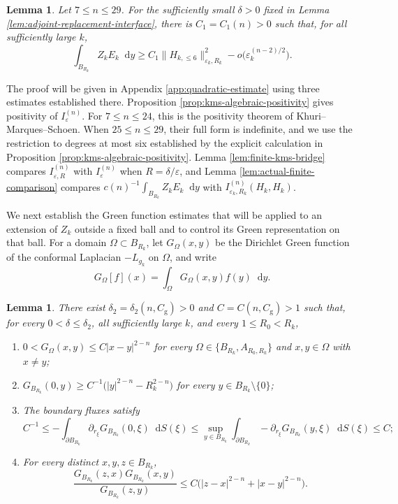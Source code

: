 \documentclass[11pt]{article}
\numberwithin{equation}{section}
\newtheorem{lemma}[theorem]{Lemma}
\theoremstyle{remark}
\newcommand{\dd}{\mathop{}\!\mathrm{d}}
\begin{document}
\begin{lemma} \label{lem:signed-residual}
Let $7\le n\le29$. For the sufficiently small $\delta>0$ fixed in
Lemma  \ref{lem:adjoint-replacement-interface}, there is
$C_1=C_1(n)>0$ such that, for all sufficiently large $k$,
{
\[
 \int_{B_{R_k}}Z_kE_k\dd y
 \ge C_1\|H_{k,\le6}\|_{\varepsilon_k,R_k}^2
 -o\bigl(\varepsilon_k^{(n-2)/2}\bigr).
\]
}
\end{lemma}

 The proof will be given in
Appendix  \ref{app:quadratic-estimate} using
three estimates established there.  Proposition  \ref{prop:kms-algebraic-positivity}
gives positivity of $I_\varepsilon^{(n)}$.  For $7\le n\le24$, this is the positivity theorem of
Khuri--Marques--Schoen.  When $25\le n\le29$, their full form is
indefinite, and we use the restriction to degrees at most six
established by the explicit calculation in
Proposition  \ref{prop:kms-algebraic-positivity}.
Lemma  \ref{lem:finite-kms-bridge} compares
$I_{\varepsilon,R}^{(n)}$ with $I_\varepsilon^{(n)}$ when
$R=\delta/\varepsilon$, and Lemma  \ref{lem:actual-finite-comparison}
compares \(c(n)^{-1}\int_{B_{R_k}}Z_kE_k\dd y\) with
$I_{\varepsilon_k,R_k}^{(n)}(H_k,H_k)$.

 
We next establish the Green function estimates that will be applied to an extension of \(Z_k\)
outside a fixed ball and to control its Green representation on that ball.
For a domain $\Omega\subset B_{R_k}$, let $G_\Omega(x,y)$ be the
Dirichlet Green  function of the conformal Laplacian $-L_{g_k}$  on $\Omega$, and write
{
\[
 G_\Omega[f](x)=\int_\Omega G_\Omega(x,y)f(y)\dd y.
\]
}
\begin{lemma} \label{lem:global-green}
There exist $\delta_2=\delta_2(n,C_{\mathrm g})>0$ and $C=C(n,C_{\mathrm g})>1$ such that, for every
$0<\delta\le\delta_2$, all sufficiently large $k$,  and every $1\le R_0<R_k$,

\begin{enumerate}[label=\emph{(\roman*)}]
\item
$0<G_\Omega(x,y)\le C|x-y|^{2-n}$ for every
$\Omega\in\{B_{R_k},A_{R_0,R_k}\}$ and $x,y\in\Omega$ with $x\ne y$;
\item
$G_{B_{R_k}}(0,y)\ge C^{-1}\bigl(|y|^{2-n}-R_k^{2-n}\bigr)$ for every
$y\in B_{R_k}\setminus\{0\}$;
\item The boundary fluxes satisfy
\[
C^{-1}\le-\int_{\partial B_{R_k}}\partial_{r_\xi}G_{B_{R_k}}(0,\xi)\dd S(\xi)
\le\sup_{y\in B_{R_k}}\int_{\partial B_{R_k}}-\partial_{r_\xi}G_{B_{R_k}}(y,\xi)\dd S(\xi)\le C;
\]
\item For every distinct $x,y,z\in B_{R_k}$,
\[
\frac{G_{B_{R_k}}(z,x)G_{B_{R_k}}(x,y)}{G_{B_{R_k}}(z,y)}
\le C\bigl(|z-x|^{2-n}+|x-y|^{2-n}\bigr).
\]
\end{enumerate}
 \end{lemma}
\end{document}
